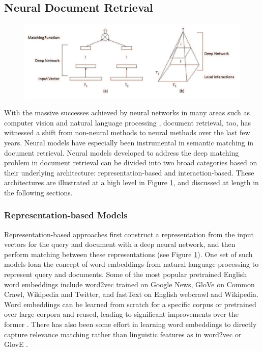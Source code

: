 
\subsection{Neural Document Retrieval}
\label{neural-retrieval}

\begin{figure}[t!]
\centering
  \includegraphics[width=5in]{deep_matching.png}
\caption{\cite{guo2017drmm}}
\label{fig:deep_matching}
\end{figure}

With the massive successes achieved by neural networks in many areas such as computer vision and natural language processing \cite{}, document retrieval, too, has witnessed a shift from non-neural methods to neural methods over the last few years.
Neural models have especially been instrumental in  semantic matching in document retrieval.
Neural models developed to address the deep matching problem in document retrieval can be divided into two broad categories based on their underlying architecture: representation-based and interaction-based.
These architectures are illustrated at a high level in Figure \ref{fig:deep_matching}, and discussed at length in the following sections.

\subsubsection{Representation-based Models}

Representation-based approaches first construct a representation from the input vectors for the query and document with a deep neural network, and then perform matching between these representations (see  Figure \ref{fig:deep_matching}).
One set of such models loan the concept of word embeddings from natural language processing to represent query and documents.
Some of the most popular pretrained English word embeddings include word2vec \cite{mikolov2013distributed} trained on  Google News, GloVe \cite{pennington2014glove} on Common Crawl, Wikipedia and Twitter, and fastText \cite{bojanowski2017enriching} on English webcrawl and Wikipedia.
Word embeddings can be learned from scratch for a specific corpus or pretrained over large corpora and reused, leading to significant improvements over the former \cite{turian2010word}.
There has also been some effort in learning word embeddings to directly capture relevance matching \cite{DBLP:journals/corr/ZamaniC17, ganguly2015word} rather than linguistic features as in word2vec \cite{mikolov2013distributed} or GlovE \cite{pennington2014glove}.

